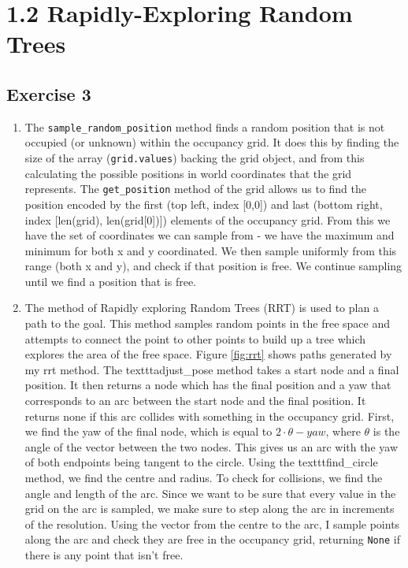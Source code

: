 \documentclass[12pt,a4paper]{article}
\begin{document}
\section*{1.2 Rapidly-Exploring Random Trees}

\subsection*{Exercise 3}
\begin{enumerate}[label=(\alph*)]
	\item The \texttt{sample\_random\_position} method finds a random position that is not occupied (or unknown) within the occupancy grid. It does this by finding the size of the array (\texttt{grid.values}) backing the grid object, and from this calculating the possible positions in world coordinates that the grid represents. The \texttt{get\_position} method of the grid allows us to find the position encoded by the first (top left, index [0,0]) and last (bottom right, index [len(grid), len(grid[0])]) elements of the occupancy grid. From this we have the set of coordinates we can sample from - we have the maximum and minimum for both x and y coordinated. We then sample uniformly from this range (both x and y), and check if that position is free. We continue sampling until we find a position that is free.
	\item The method of Rapidly exploring Random Trees (RRT) is used to plan a path to the goal. This method samples random points in the free space and attempts to connect the point to other points to build up a tree which explores the area of the free space. Figure \ref{fig:rrt} shows paths generated by my rrt method. The texttt{adjust\_pose} method takes a start node and a final position. It then returns a node which has the final position and a yaw that corresponds to an arc between the start node and the final position. It returns none if this arc collides with something in the occupancy grid. First, we find the yaw of the final node, which is equal to $2 \cdot \theta - yaw$, where $\theta$ is the angle of the vector between the two nodes. This gives us an arc with the yaw of both endpoints being tangent to the circle. Using the texttt{find\_circle} method, we find the centre and radius. To check for collisions, we find the angle and length of the arc. Since we want to be sure that every value in the grid on the arc is sampled, we make sure to step along the arc in increments of the resolution. Using the vector from the centre to the arc, I sample points along the arc and check they are free in the occupancy grid, returning \texttt{None} if there is any point that isn't free.	

\end{enumerate}
\end{document}
